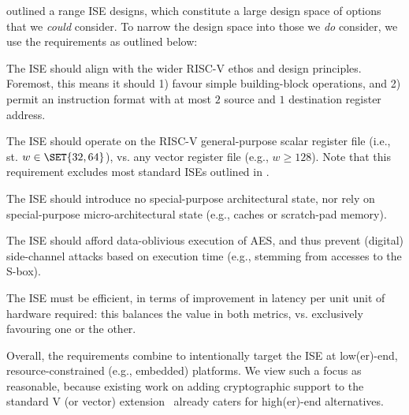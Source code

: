 
outlined a range ISE designs, which constitute a large design space of
options that we {\em could} consider.  To narrow the design space into
those we {\em do} consider, we use the requirements as outlined below:

\begin{requirement}
The ISE should align with the wider RISC-V ethos and design principles.
Foremost, this means it should 
1) favour simple building-block operations,
   and
2) permit an instruction format with at most $2$ source and $1$ destination register address.
\end{requirement}

\begin{requirement}
The ISE should operate on 
the RISC-V general-purpose scalar register file 
(i.e., st. $w \in \SET{32,64}$),
vs. 
any                        vector register file
(e.g., $w \ge 128$).
Note that this requirement excludes most standard ISEs outlined in 
.
\end{requirement}

\begin{requirement}
The ISE should introduce no
special-purpose       architectural state, 
nor rely on
special-purpose micro-architectural state
(e.g., caches or scratch-pad memory).
\end{requirement}

\begin{requirement}
The ISE should afford data-oblivious execution of AES, and thus prevent 
(digital) side-channel attacks based on execution time 
(e.g., stemming from accesses to the S-box).
\end{requirement}


\begin{requirement}
The ISE must be efficient, in terms of improvement in latency per unit
unit of hardware required: this balances the value in both metrics, vs.
exclusively favouring one or the other.
\end{requirement}

\noindent
Overall, the requirements combine to intentionally target the ISE at 
 low(er)-end,
resource-constrained (e.g., embedded) platforms.  
We view such a focus as reasonable, because existing work on adding
cryptographic support to the
standard V 
(or vector) 
extension~\cite[Section 21]{RV:ISA:I:19}
already caters for
high(er)-end
alternatives.

